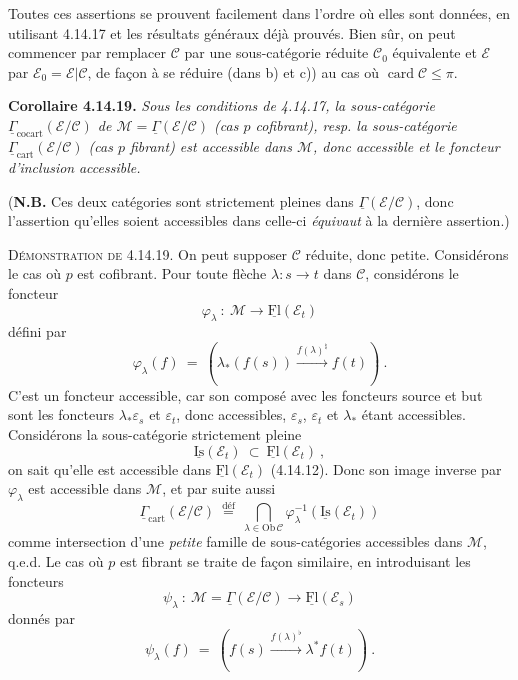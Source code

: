 \documentclass[11pt]{article}
\newcommand{\printedpage}[1]{\marginpar{\footnotesize p.~#1}}
\newcommand{\msp}[1]{\marginpar{\footnotesize [#1]}}
\newcommand{\uGamma}{\underline{\Gamma}}
\newcommand{\uFl}{\underline{\mathrm{Fl}}}
\newcommand{\uIs}{\underline{\mathrm{Is}}}
\newcommand{\Ob}{\mathrm{Ob}\,}
\newcommand{\Fl}{\mathrm{Fl}\,}
\newcommand{\cocart}{\mathrm{cocart}}
\newcommand{\cart}{\mathrm{cart}}
\begin{document}
\printedpage{149}

\msp{page 393}
Toutes ces assertions se prouvent facilement dans l’ordre où elles sont données, en utilisant 4.14.17 et les résultats généraux déjà prouvés. Bien sûr, on peut commencer par remplacer $\mathcal{C}$ par une sous-catégorie réduite $\mathcal{C}_0$ équivalente et $\mathcal{E}$ par $\mathcal{E}_0 = \mathcal{E}|\mathcal{C}$, de façon à se réduire (dans b) et c)) au cas où $\operatorname{card}\mathcal{C} \leqslant \pi$.

\textbf{Corollaire 4.14.19.} \textit{Sous les conditions de 4.14.17, la sous-catégorie $\uGamma_{\cocart}(\mathcal{E}/\mathcal{C})$ de $\mathcal{M} = \uGamma(\mathcal{E}/\mathcal{C})$ (cas $p$ cofibrant), resp. la sous-catégorie $\uGamma_{\cart}(\mathcal{E}/\mathcal{C})$ (cas $p$ fibrant) est accessible dans $\mathcal{M}$, donc accessible et le foncteur d’inclusion} \textit{accessible.}

(\textbf{N.B.} Ces deux catégories sont strictement pleines dans $\uGamma(\mathcal{E}/\mathcal{C})$, donc l’assertion qu’elles soient accessibles dans celle-ci \textit{équivaut} à la dernière assertion.)

\textsc{Démonstration de} 4.14.19. On peut supposer $\mathcal{C}$ réduite, donc petite. Considérons le cas où $p$ est cofibrant. Pour toute flèche $\lambda : s \longrightarrow t$ dans $\mathcal{C}$, considérons le foncteur
\[
\varphi_\lambda \ : \ \mathcal{M} \longrightarrow \uFl(\mathcal{E}_t)
\]
défini par
\msp{page 394}
\[
\varphi_\lambda(f) \ = \ (\lambda_*(f(s)) \xrightarrow{f(\lambda)^\natural} f(t)) \ .
\]
C’est un foncteur accessible, car son composé avec les foncteurs source et but sont les foncteurs $\lambda_*\varepsilon_s$ et $\varepsilon_t$, donc accessibles, $\varepsilon_s$, $\varepsilon_t$ et $\lambda_*$ étant accessibles. Considérons la sous-catégorie strictement pleine
\[
\uIs(\mathcal{E}_t) \ \subset \ \uFl(\mathcal{E}_t) \ ,
\]
on sait qu’elle est accessible dans $\uFl(\mathcal{E}_t)$ (4.14.12). Donc son image inverse par $\varphi_\lambda$ est accessible dans $\mathcal{M}$, et par suite aussi
\[
\uGamma_{\cart}(\mathcal{E}/\mathcal{C}) \ \overset{\text{déf}}{=} \ \bigcap_{\lambda\in\Ob\mathcal{C}} \varphi_\lambda^{-1}(\uIs(\mathcal{E}_t))
\]
comme intersection d’une \textit{petite} famille de sous-catégories accessibles dans $\mathcal{M}$, q.e.d. Le cas où $p$ est fibrant se traite de façon similaire, en introduisant les foncteurs
\[
\psi_\lambda \ : \ \mathcal{M} = \uGamma(\mathcal{E}/\mathcal{C}) \longrightarrow \uFl(\mathcal{E}_s)
\]
donnés par
\[
\psi_\lambda(f) \ = \ (f(s) \xrightarrow{f(\lambda)^\flat} \lambda^* f(t)) \ .
\]
\end{document}
